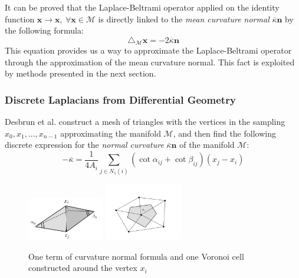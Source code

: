 It can be proved that the Laplace-Beltrami operator applied on the identity function $\mathbf x \rightarrow \mathbf x, \ \forall \mathbf x\in \mathcal M$ is directly linked to the \textit{mean curvature normal} $\overline{\kappa}\mathbf n$ by the following formula:
\begin{equation}\label{eq:laplacian and curvature}
	\triangle_\mathcal M \mathbf x  = -2\overline{\kappa}\mathbf n
\end{equation}
This equation provides us a way to approximate the Laplace-Beltrami operator through the approximation of the mean curvature normal. This fact is exploited by methods presented in the next section.



\subsubsection{Discrete Laplacians from Differential Geometry}
Desbrun et al. \cite{Desbrun1999} construct a mesh of triangles with the vertices in the sampling $x_0, x_1, ..., x_{n-1}$ approximating the manifold $\mathcal M$, and then find the following discrete expression for the \textit{normal curvature} $\overline{\kappa} \mathbf{n}$ of the manifold $\mathcal M$:
\begin{equation}\label{eq:curvature normal}
	-\overline{\kappa} =\frac{1}{4 A_i} \sum_{j \in N_{1}(i)}\left(\cot \alpha_{ij}+\cot \beta_{ij}\right)\left(x_{j}-x_{i}\right)
\end{equation}


\begin{figure}
	\label{fig:Desbrun}
	\begin{center}
		\includegraphics[width=0.3\textwidth]{figs/Chapter3/MyDesbrun.png}
		\includegraphics[width=0.3\textwidth]{figs/Chapter3/Voronoi}
	\end{center}
	\caption{One term of curvature normal formula and one Voronoi cell constructed around the vertex $x_i$}
\end{figure} 

